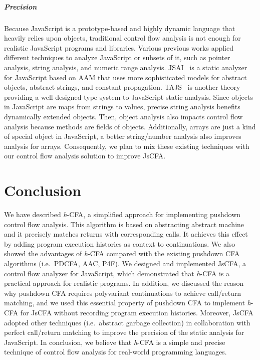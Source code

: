 \documentclass[12pt]{report}
\begin{document}
\paragraph{Precision}
Because JavaScript is a prototype-based and highly dynamic language that heavily relies upon objects,
traditional control flow analysis is not enough for realistic JavaScript programs and libraries.
Various previous works applied different techniques to analyze JavaScript or subsets of it, such as pointer analysis, string analysis, and numeric range analysis.
JSAI~\cite{kashyap2014jsai} is a static analyzer for JavaScript based on AAM that uses more sophisticated models for abstract objects, abstract strings, and constant propagation.
TAJS~\cite{jensen2009type} is another theory providing a well-designed type system to JavaScript static analysis.
Since objects in JavaScript are maps from strings to values, precise string analysis benefits dynamically extended objects.
Then, object analysis also impacts control flow analysis because methods are fields of objects.
Additionally, arrays are just a kind of special object in JavaScript, a better string/number analysis also improves analysis for arrays.
Consequently, we plan to mix these existing techniques with our control flow analysis solution to improve JsCFA\@.

\chapter{Conclusion}
\label{sec:Conclude}
We have described \textit{h}-CFA, a simplified approach for implementing pushdown control flow analysis.
This algorithm is based on abstracting abstract machine and it precisely matches returns with corresponding calls.
It achieves this effect by adding program execution histories as context to continuations.
We also showed the advantages of \textit{h}-CFA compared with the existing pushdown CFA algorithms (i.e.\ PDCFA, AAC, P4F).
We designed and implemented JsCFA, a control flow analyzer for JavaScript, which demonstrated that \textit{h}-CFA is a practical approach for realistic programs.
In addition, we discussed the reason why pushdown CFA requires polyvariant continuations to achieve call/return matching, and we used this essential property of pushdown CFA to implement \textit{h}-CFA for JsCFA without recording program execution histories.
Moreover, JsCFA adopted other techniques (i.e.\ abstract garbage collection) in collaboration with perfect call/return matching to improve the precision of the static analysis for JavaScript.
In conclusion, we believe that \textit{h}-CFA is a simple and precise technique of control flow analysis for real-world programming languages.

\clearpage
{}


\end{document}
